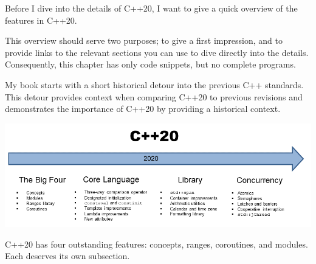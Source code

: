 

Before I dive into the details of C++20, I want to give a quick overview of the features in C++20.

This overview should serve two purposes; to give a first impression, and to provide links to the relevant sections you can use to dive directly into the details. Consequently, this chapter has only code snippets, but no complete programs.

My book starts with a short historical detour into the previous C++ standards. This detour provides context when comparing C++20 to previous revisions and demonstrates the importance of C++20 by providing a historical context.

\begin{center}
\includegraphics[width=1.0\textwidth]{content/2/chapter3/images/1.png}\\
\end{center}

C++20 has four outstanding features: concepts, ranges, coroutines, and modules. Each deserves its own subsection.








